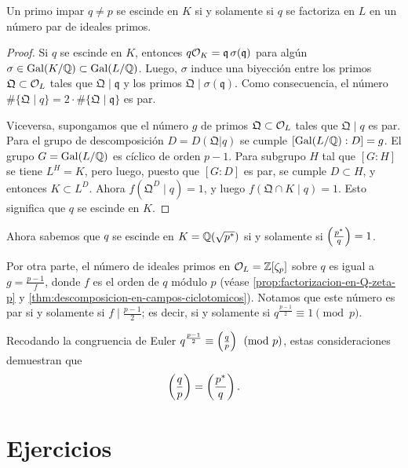 \begin{lema}
  Un primo impar $q \ne p$ se escinde en $K$ si y solamente si
  $q$ se factoriza en $L$ en un número par de ideales primos.

  \begin{proof}
    Si $q$ se escinde en $K$, entonces
    $q\mathcal{O}_K = \mathfrak{q} \, \sigma (\mathfrak{q})$ para algún
    $\sigma \in \operatorname{Gal} (K/\mathbb{Q}) \subset \operatorname{Gal} (L/\mathbb{Q})$. Luego, $\sigma$ induce una
    biyección entre los primos $\mathfrak{Q} \subset \mathcal{O}_L$ tales que
    $\mathfrak{Q} \mid \mathfrak{q}$ y los primos
    $\mathfrak{Q} \mid \sigma (\mathfrak{q})$. Como consecuencia, el número
    $\# \{ \mathfrak{Q} \mid q \} = 2\cdot \# \{ \mathfrak{Q} \mid \mathfrak{q} \}$
    es par.

    Viceversa, supongamos que el número $g$ de primos
    $\mathfrak{Q} \subset \mathcal{O}_L$ tales que $\mathfrak{Q} \mid q$ es par.
    Para el grupo de descomposición $D = D (\mathfrak{Q} | q)$ se cumple
    $[\operatorname{Gal} (L/\mathbb{Q}) : D] = g$. El grupo $G = \operatorname{Gal} (L/\mathbb{Q})$ es cíclico de orden
    $p-1$. Para subgrupo $H$ tal que $[G : H]$ se tiene $L^H = K$, pero luego,
    puesto que $[G : D]$ es par, se cumple $D \subset H$, y entonces
    $K \subset L^D$. Ahora $f (\mathfrak{Q}^D\mid q) = 1$, y luego
    $f (\mathfrak{Q}\cap K\mid q) = 1$. Esto significa que $q$ se
    escinde en $K$.
  \end{proof}
\end{lema}

Ahora sabemos que $q$ se escinde en $K = \mathbb{Q} (\sqrt{p^*})$ si y solamente si
$\left(\frac{p^*}{q}\right) = 1$.

Por otra parte, el número de ideales primos en $\mathcal{O}_L = \mathbb{Z} [\zeta_p]$ sobre $q$
es igual a $g = \frac{p-1}{f}$, donde $f$ es el orden de $q$ módulo $p$
(véase \ref{prop:factorizacion-en-Q-zeta-p} y
\ref{thm:descomposicion-en-campos-ciclotomicos}). Notamos que este número es
par si y solamente si $f \mid \frac{p-1}{2}$; es decir, si y solamente si
$q^{\frac{p-1}{2}} \equiv 1 \pmod{p}$.

Recodando la congruencia de Euler
$q^{\frac{p-1}{2}} \equiv \left(\frac{q}{p}\right) \pmod{p}$, estas consideraciones
demuestran que
$$\left(\frac{q}{p}\right) = \left(\frac{p^*}{q}\right).$$


\pagebreak


\section*{Ejercicios}

